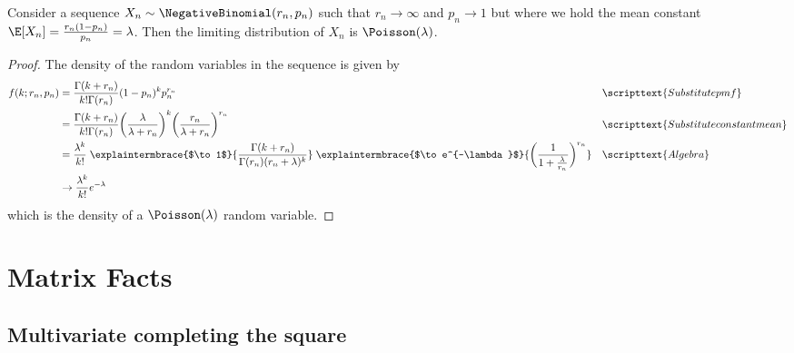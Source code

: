 \documentclass{article} %
\begin{document}
\begin{proposition}
Consider a sequence $X_n \sim \NegativeBinomial(r_n, p_n)$ such that $r_n \to \infty$ and $p_n \to 1$ but where we hold the mean constant $\E[X_n] = \frac{r_n (1-p_n)}{p_n} = \lambda$.  Then the limiting distribution of $X_n$ is $\Poisson(\lambda)$.
\end{proposition}



\begin{proof}
The density of the random variables in the sequence is given by
%
\begin{align*}
f(k; r_n,p_n) &= \frac{\Gamma(k+r_n)}{k! \Gamma(r_n)} (1-p_n)^k p_n^{r_n} && \scripttext{Substitute pmf} \\
&= \frac{\Gamma(k+r_n)}{k! \Gamma(r_n)} \bigg(\frac{\lambda}{\lambda+r_n}\bigg)^k \bigg(\frac{r_n}{\lambda+r_n}\bigg)^{r_n}&& \scripttext{Substitute constant mean} \\
&= \frac{\lambda^k}{k!} \;\explaintermbrace{$\to 1$}{\frac{\Gamma(k+r_n)}{\Gamma(r_n) (r_n +\lambda)^k}} \;  \explaintermbrace{$\to e^{-\lambda}$}{\bigg(\frac{1}{1+\frac{\lambda}{r_n}}\bigg)^{r_n}} && \scripttext{Algebra} \\
& \to \frac{\lambda^k}{k!} e^{-\lambda}
\end{align*}
%
which is the density of a $\Poisson(\lambda)$ random variable.
\end{proof}









\newpage 
 \appendix
 

\section{Matrix Facts}

\subsection{Multivariate completing the square}
\end{document}
